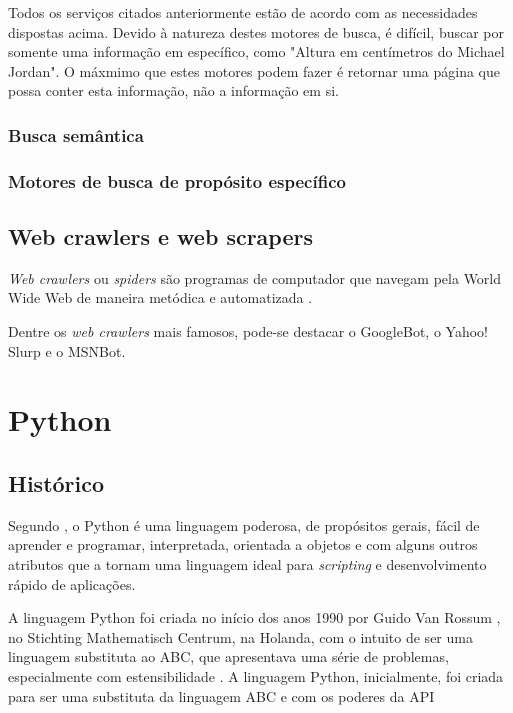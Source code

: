 Todos os serviços citados anteriormente estão de acordo com as necessidades dispostas acima. Devido à natureza destes motores de busca, é difícil, buscar por somente uma informação em específico, como "Altura em centímetros do Michael Jordan". O máxmimo que estes motores podem fazer é retornar uma página que possa conter esta informação, não a informação em si.

\subsubsection{Busca semântica}

\subsubsection{Motores de busca de propósito específico}

\subsection{Web crawlers e web scrapers}

\emph{Web crawlers} ou \emph{spiders} são programas de computador que navegam pela World Wide Web de maneira metódica e automatizada \cite{herberth}.

Dentre os \emph{web crawlers} mais famosos, pode-se destacar o GoogleBot, o Yahoo! Slurp e o MSNBot.

\pagebreak
\section{Python}

\subsection{Histórico}
Segundo \cite{pythondoc}, o Python é uma linguagem poderosa, de propósitos gerais, fácil de aprender e programar, interpretada, orientada a objetos e com alguns outros atributos que a tornam uma linguagem ideal para \emph{scripting} e desenvolvimento rápido de aplicações.

A linguagem Python foi criada no início dos anos 1990 por Guido Van Rossum \cite{pythonlicense}, no Stichting Mathematisch Centrum, na Holanda, com o intuito de ser uma linguagem substituta ao ABC, que apresentava uma série de problemas, especialmente com estensibilidade \cite{pythonfaq}. A linguagem Python, inicialmente, foi criada para ser uma substituta da linguagem ABC e com os poderes da API 

